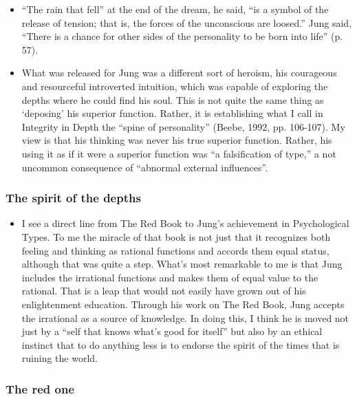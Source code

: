 \begin{itemize}
\item ``The rain that fell'' at the end of the dream, he said, ``is a symbol of
the release of tension; that is, the forces of the unconscious are loosed.''
Jung said, ``There is a chance for other sides of the personality to be born
into life'' (p. 57).

\item What was released for Jung was a different sort of heroism, his
courageous and resourceful introverted intuition, which was capable of
exploring the depths where he could find his soul.  This is not quite the same
thing as `deposing' his superior function. Rather, it is establishing what I
call in Integrity in Depth the ``spine of personality'' (Beebe, 1992, pp.
106-107). My view is that his thinking was never his true superior function.
Rather, his using it as if it were a superior function was ``a falsification of
type,'' a not uncommon consequence of ``abnormal external influences''.

\end{itemize}

\subsubsection{The spirit of the depths}

\begin{itemize}

\item I see a direct line from The Red Book to Jung's achievement in
Psychological Types. To me the miracle of that book is not just that it
recognizes both feeling and thinking as rational functions and accords them
equal status, although that was quite a step.  What's most remarkable to me is
that Jung includes the irrational functions and makes them of equal value to
the rational.  That is a leap that would not easily have grown out of his
enlightenment education.  Through his work on The Red Book, Jung accepts the
irrational as a source of knowledge.  In doing this, I think he is moved not
just by a ``self that knows what's good for itself'' but also by an ethical
instinct that to do anything less is to endorse the spirit of the times that is
ruining the world.

\end{itemize}

\subsubsection{The red one}

